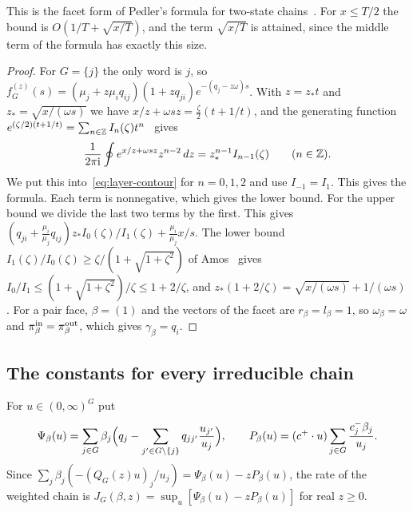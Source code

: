This is the facet form of Pedler's formula for two-state chains~\cite{pedler1971}. For
$x\le T/2$ the bound is $O(1/T+\sqrt{x/T})$, and the term $\sqrt{x/T}$ is attained, since the
middle term of the formula has exactly this size.

\begin{proof}
For $G=\{j\}$ the only word is $j$, so
$f^{(z)}_G(s)=(\mu_j+z\mu_iq_{ij})(1+zq_{ji})e^{-(q_j-z\omega)s}$. With $z=z_*t$ and
$z_*=\sqrt{x/(\omega s)}$ we have $x/z+\omega sz=\frac\zeta2(t+1/t)$, and the generating
function $e^{(\zeta/2)(t+1/t)}=\sum_{n\in\mathbb{Z}}I_n(\zeta)t^n$~\cite[Eq.~10.35.1]{dlmf} gives
\begin{equation}\label{eq:layer-bessel-moments}
\frac1{2\pi\mathrm i}\oint e^{x/z+\omega sz}z^{n-2}\,dz=z_*^{n-1}I_{n-1}(\zeta)\qquad(n\in\mathbb{Z}).
\end{equation}
We put this into~\eqref{eq:layer-contour} for $n=0,1,2$ and use $I_{-1}=I_1$. This gives the
formula. Each term is nonnegative, which gives the lower bound. For the upper bound we divide
the last two terms by the first. This gives
$(q_{ji}+\frac{\mu_i}{\mu_j}q_{ij})z_*I_0(\zeta)/I_1(\zeta)+\frac{\mu_i}{\mu_j}x/s$. The lower
bound $I_1(\zeta)/I_0(\zeta)\ge\zeta/(1+\sqrt{1+\zeta^2})$ of Amos~\cite{amos1974} gives
$I_0/I_1\le(1+\sqrt{1+\zeta^2})/\zeta\le1+2/\zeta$, and $z_*(1+2/\zeta)=\sqrt{x/(\omega s)}+1/(\omega s)$.
For a pair face, $\beta=(1)$ and the vectors of the facet are $r_\beta=l_\beta=1$, so
$\omega_\beta=\omega$ and $\pi^{\rm in}_\beta=\pi^{\rm out}_\beta$, which gives
$\gamma_\beta=q_i$.
\end{proof}

\subsection{The constants for every irreducible chain}\label{sec:layer-constants}

For $u\in(0,\infty)^G$ put
\[
\Psi_\beta(u)=\sum_{j\in G}\beta_j\Bigl(q_j-\sum_{j'\in G\setminus\{j\}}q_{jj'}\frac{u_{j'}}{u_j}\Bigr),\qquad
P_\beta(u)=(c^+\cdot u)\sum_{j\in G}\frac{c^-_j\beta_j}{u_j}.
\]
Since $\sum_j\beta_j(-(Q_G(z)u)_j/u_j)=\Psi_\beta(u)-zP_\beta(u)$, the rate of the weighted
chain is $J_G(\beta,z)=\sup_u[\Psi_\beta(u)-zP_\beta(u)]$ for real $z\ge0$.

